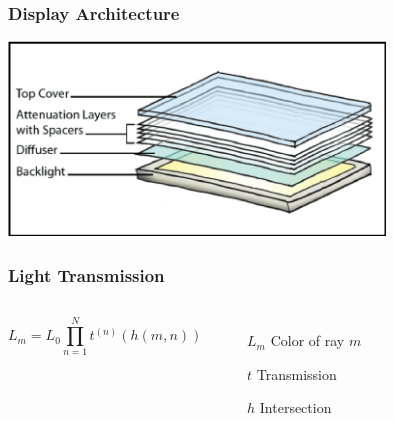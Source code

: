 \documentclass[12pt, compress]{beamer}
\begin{document}
\begin{frame}[fragile]
	\frametitle{Display Architecture}
	\begin{center}
		\includegraphics[width=10cm]{images/display_architecture.png}
	\end{center}
\end{frame}

\begin{frame}[fragile]
	\frametitle{Light Transmission}
	\vspace{1cm}
	\begin{columns}[onlytextwidth]
			
			\begin{equation*}
				L_m = L_0 \prod_{n=1}^{N} t^{(n)} (h(m, n)) 
			\end{equation*}
			\begin{itemize}[<alert@+>]
			    \item[$L_m$] Color of ray $m$
			    \item[$t$] Transmission
			    \item[$h$] Intersection 
			\end{itemize}
	\end{columns}
	\vspace{1cm}
	\begin{center}
	\end{center}
\end{frame}
\end{document}
